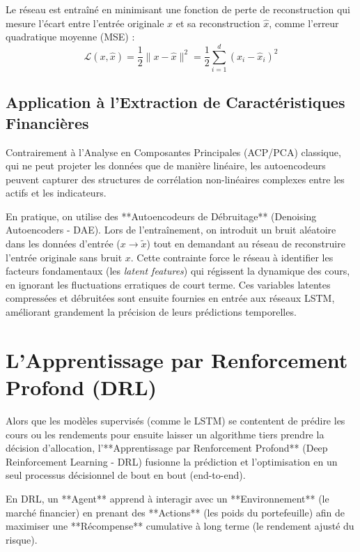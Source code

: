 Le réseau est entraîné en minimisant une fonction de perte de reconstruction qui mesure l'écart entre l'entrée originale $x$ et sa reconstruction $\hat{x}$, comme l'erreur quadratique moyenne (MSE) :
\begin{equation}
    \mathcal{L}(x, \hat{x}) = \frac{1}{2} \|x - \hat{x}\|^2 = \frac{1}{2} \sum_{i=1}^{d} (x_i - \hat{x}_i)^2
\end{equation}

\subsection{Application à l'Extraction de Caractéristiques Financières}
Contrairement à l'Analyse en Composantes Principales (ACP/PCA) classique, qui ne peut projeter les données que de manière linéaire, les autoencodeurs peuvent capturer des structures de corrélation non-linéaires complexes entre les actifs et les indicateurs.

En pratique, on utilise des **Autoencodeurs de Débruitage** (Denoising Autoencoders - DAE). Lors de l'entraînement, on introduit un bruit aléatoire dans les données d'entrée ($x \rightarrow \tilde{x}$) tout en demandant au réseau de reconstruire l'entrée originale sans bruit $x$. Cette contrainte force le réseau à identifier les facteurs fondamentaux (les \textit{latent features}) qui régissent la dynamique des cours, en ignorant les fluctuations erratiques de court terme. Ces variables latentes compressées et débruitées sont ensuite fournies en entrée aux réseaux LSTM, améliorant grandement la précision de leurs prédictions temporelles.

\section{L'Apprentissage par Renforcement Profond (DRL)}
Alors que les modèles supervisés (comme le LSTM) se contentent de prédire les cours ou les rendements pour ensuite laisser un algorithme tiers prendre la décision d'allocation, l'**Apprentissage par Renforcement Profond** (Deep Reinforcement Learning - DRL) fusionne la prédiction et l'optimisation en un seul processus décisionnel de bout en bout (end-to-end).

En DRL, un **Agent** apprend à interagir avec un **Environnement** (le marché financier) en prenant des **Actions** (les poids du portefeuille) afin de maximiser une **Récompense** cumulative à long terme (le rendement ajusté du risque).

